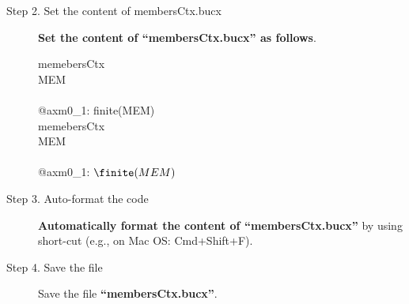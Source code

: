 \begin{description}
\item[Step 2. Set the content of membersCtx.bucx] \textbf{Set the content of ``membersCtx.bucx'' as follows}.
  \begin{center}
    \begin{Bcode}
      \ifplastex
      \Bcontext{} memebersCtx\\
      \Bsets{} MEM\\
      \Baxioms\\
      @axm0_1: finite(MEM)\\
      \Bend
      \else
      \Bcontext{} memebersCtx\\
      \Bsets{} MEM\\
      \Baxioms\\
      \Btab @axm0_1: \(\finite(MEM)\)\\
      \Bend
      \fi
    \end{Bcode}
  \end{center}

\item [Step 3. Auto-format the code] \textbf{Automatically format the content of ``membersCtx.bucx''} by using short-cut (e.g., on Mac OS: Cmd+Shift+F).

\item[Step 4. Save the file] Save the file \textbf{``membersCtx.bucx''}.
\end{description}

